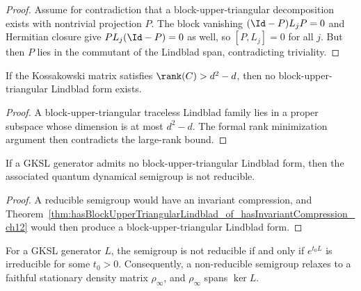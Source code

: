 \begin{proof}\leanok
    Assume for contradiction that a block-upper-triangular decomposition
    exists with nontrivial projection $P$. The block vanishing
    $(\Id-P)L_jP=0$ and Hermitian closure give $PL_j(\Id-P)=0$ as
    well, so $[P,L_j]=0$ for all $j$. But then $P$ lies in the
    commutant of the Lindblad span, contradicting triviality.
\end{proof}

\begin{theorem}
    \label{thm:large_kossakowski_rank_no_block_ut_ch12}
    \leanok
    If the Kossakowski matrix satisfies $\rank(C)>d^2-d$, then no
    block-upper-triangular Lindblad form exists.
\end{theorem}

\begin{proof}
    \leanok
    A block-upper-triangular traceless Lindblad family lies in a proper subspace whose dimension is
    at most $d^2-d$. The formal rank minimization argument then contradicts the large-rank bound.
\end{proof}

\begin{theorem}
    \label{thm:not_isReducibleQDS_of_no_blockUpperTriangular_ch12}
    \leanok
    If a GKSL generator admits no block-upper-triangular Lindblad form, then the associated
    quantum dynamical semigroup is not reducible.
\end{theorem}

\begin{proof}
    \leanok
    A reducible semigroup would have an invariant compression, and
    Theorem~\ref{thm:hasBlockUpperTriangularLindblad_of_hasInvariantCompression_ch12}
    would then produce a block-upper-triangular Lindblad form.
\end{proof}

\begin{theorem}
    \label{thm:not_reducible_implies_faithful_relaxation}
    \leanok
    For a GKSL generator $L$, the semigroup is not reducible if and only if
    $e^{t_0L}$ is irreducible for some $t_0>0$.  Consequently, a
    non-reducible semigroup relaxes to a faithful stationary density matrix
    $\rho_\infty$, and $\rho_\infty$ spans $\ker L$.
\end{theorem}

